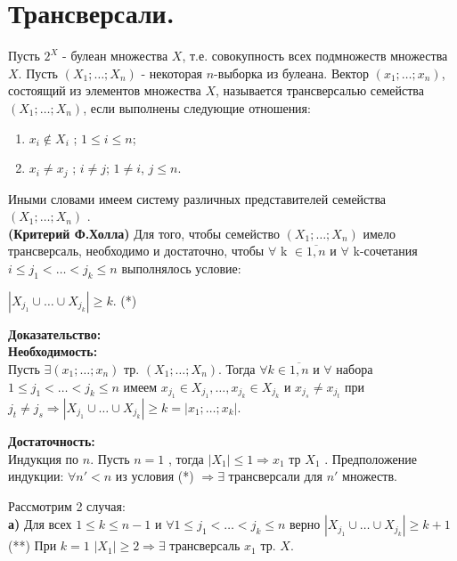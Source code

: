 \section{Трансверсали.}

\opri Пусть $2^{X}$ - булеан множества $X$, т.е. совокупность всех подмножеств множества $X$. Пусть $(X_1; \dots; X_n)$ - некоторая $n$-выборка из булеана. Вектор $(x_1; \dots; x_n)$, состоящий из элементов множества $X$, называется трансверсалью семейства $(X_1; \dots; X_n)$, если выполнены следующие отношения:

\begin{enumerate}
\item $x_i \notin X_i$ ; $1 \leq i \leq n$;
\item $x_i \neq x_j$ ; $i \neq j$; $1 \neq i$, $j \leq n$.
\end{enumerate}

Иными словами имеем систему различных представителей семейства $(X_1; \dots; X_n)$ .\\

\thr \textbf{(Критерий Ф.Холла)}
Для того, чтобы семейство $(X_1; \dots; X_n)$ имело трансверсаль, необходимо и достаточно, чтобы $\forall$ k $\in \overline{1,n}$ и $\forall$ k-сочетания $i \leq j_1 < \dots < j_k \leq n$ выполнялось условие:

\begin{center}
$|X_{j_1} \cup \dots \cup X_{j_k}|\geq k$. (*)
\end{center}

\textbf{Доказательство:}\\

\textbf{Необходимость:}\\
Пусть $\exists (x_1; \dots; x_n)$ тр. $(X_1; \dots; X_n)$. Тогда $\forall k \in \overline{1,n}$ и $\forall$ набора $1 \leq j_1 < \dots < j_k\leq n$ имеем $x_{j_1} \in X_{j_1}, \dots, x_{j_k} \in X_{j_k}$ и $x_{j_s} \neq x_{j_t}$ при $j_t \neq j_s \Rightarrow |X_{j_1} \cup \dots \cup X_{j_k}| \geq k = |{x_1; \dots; x_k}|$.

\textbf{Достаточность:}\\
Индукция по $n$. Пусть $n=1$ , тогда
$|X_1| \leq 1 \Rightarrow {x_1}$ тр $X_1$ .
Предположение индукции: $\forall n' < n$ из условия (*) $\Rightarrow \exists$ трансверсали для $n'$ множеств. 

Рассмотрим 2 случая:\\

\textbf{а)} Для всех $1 \leq k \leq n-1$ и $\forall 1 \leq j_1 < \dots < j_k \leq n$ верно $|X_{j_1} \cup \dots \cup X_{j_k}| \geq k+1$ (**)
При $k=1$ $|X_1| \geq 2 \Rightarrow \exists$ трансверсаль $x_1$ тр. $X$.


